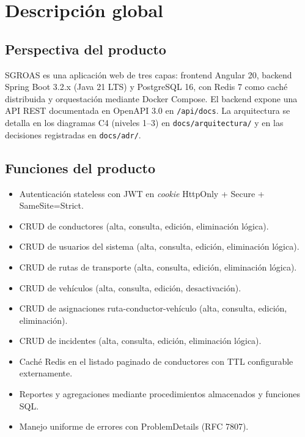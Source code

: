\documentclass[12pt,a4paper]{article}
\begin{document}
\section{Descripción global}
\label{sec:descripcion}

\subsection{Perspectiva del producto}
\label{sec:perspectiva}

SGROAS es una aplicación web de tres capas: frontend Angular 20, backend Spring Boot 3.2.x
(Java 21 LTS) y PostgreSQL 16, con Redis 7 como caché distribuida y orquestación mediante
Docker Compose. El backend expone una API REST documentada en OpenAPI 3.0 en \texttt{/api/docs}.
La arquitectura se detalla en los diagramas C4 (niveles 1--3) en \texttt{docs/arquitectura/} y en
las decisiones registradas en \texttt{docs/adr/}.

\subsection{Funciones del producto}
\label{sec:funciones}

\begin{itemize}
  \item Autenticación stateless con JWT en \textit{cookie} HttpOnly + Secure + SameSite=Strict.
  \item CRUD de conductores (alta, consulta, edición, eliminación lógica).
  \item CRUD de usuarios del sistema (alta, consulta, edición, eliminación lógica).
  \item CRUD de rutas de transporte (alta, consulta, edición, eliminación lógica).
  \item CRUD de vehículos (alta, consulta, edición, desactivación).
  \item CRUD de asignaciones ruta-conductor-vehículo (alta, consulta, edición, eliminación).
  \item CRUD de incidentes (alta, consulta, edición, eliminación lógica).
  \item Caché Redis en el listado paginado de conductores con TTL configurable externamente.
  \item Reportes y agregaciones mediante procedimientos almacenados y funciones SQL.
  \item Manejo uniforme de errores con ProblemDetails (RFC 7807).
\end{itemize}
\end{document}
